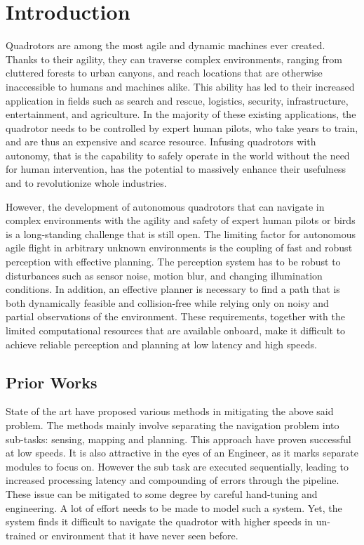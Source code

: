 \clearpage
\chapter{Introduction}

Quadrotors are among the most agile and dynamic machines ever created. Thanks to their agility, they can traverse complex environments, ranging from cluttered forests to urban canyons, and reach locations that are otherwise inaccessible to humans and machines alike. This ability has led to their increased application in fields such as search and rescue, logistics, security, infrastructure, entertainment, and agriculture. In the majority of these existing applications, the quadrotor needs to be controlled by expert human pilots, who take years to train, and are thus an expensive and scarce resource. Infusing quadrotors with autonomy, that is the capability to safely operate in the world without the need for human intervention, has the potential to massively enhance their usefulness and to revolutionize whole industries.

However, the development of autonomous quadrotors that can navigate in complex environments with the agility and safety of expert human pilots or birds is a long-standing challenge that is still open. The limiting factor for autonomous agile flight in arbitrary unknown environments is the coupling of fast and robust perception with effective planning. The perception system has to be robust to disturbances such as sensor noise, motion blur, and changing illumination conditions. In addition, an effective planner is necessary to find a path that is both dynamically feasible and collision-free while relying only on noisy and partial observations of the environment. These requirements, together with the limited computational resources that are available onboard, make it difficult to achieve reliable perception and planning at low latency and high speeds.

\section{Prior Works}
State of the art have proposed various methods in mitigating the above said problem. The methods mainly involve separating the navigation problem into sub-tasks: sensing, mapping and planning. This approach have proven successful at low speeds. It is also attractive in the eyes of an Engineer, as it marks separate modules to focus on. However the sub task are executed sequentially, leading to increased processing latency and compounding of errors through the pipeline. These issue can be mitigated to some degree by careful hand-tuning and engineering. A lot of effort needs to be made to model such a system. Yet, the system finds it difficult to navigate the quadrotor with higher speeds in un-trained or environment that it have never seen before.

